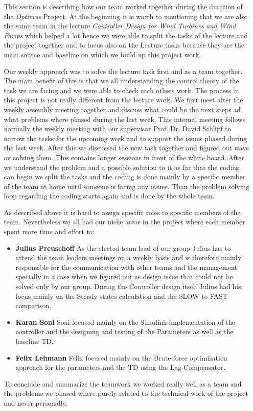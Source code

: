 This section is describing how our team worked together during the duration of the \textit{Optimus} Project. At the beginning it is worth to mentioning that we are also the same team in the lecture \textit{Controller Design for Wind	Turbines and Wind Farms} which helped a lot hence we were able to split the tasks of the lecture and the project together and to focus also on the Lecture tasks because they are the main source and baseline on which we build up this project work.

Our weekly approach was to solve the lecture task first and as a team together. The main benefit of this is that we all understanding the control theory of the task we are facing and we were able to check each others work. The process in this project is not really different from the lecture work. We first meet after the weekly assembly meeting together and discuss what could be the next steps ad what problems where phased during the last week. This internal meeting follows normally the weekly meeting with our supervisor Prof. Dr. David Schlipf to narrow the tasks for the upcoming week and to support the issues phased during the last week. After this we discussed the new task together and figured out ways ov solving them. This contains longer sessions in front of the white board. After we understand the problem and a possible solution to it as far that the coding can begin we split the tasks and the coding is done mainly by a specific member of the team at home until someone is facing any issues. Than the problem solving loop regarding the coding starts again and is done by the whole team. 

As described above it is hard to assign specific roles to specific members of the team. Nevertheless we all had our niche areas in the project where each member spent more time and effort to: 
\begin{itemize}
	\item \textbf{Julius Preuschoff} As the elected team lead of our group Julius has to attend the team leaders meetings on a weekly basis and is therefore mainly responsible for the communication with other teams and the management specially in a case when we figured out as design issue that could not be solved only by our group. During the Controller design itself Julius had his focus mainly on the Steady states calculation and the SLOW to FAST comparison.
	\item \textbf{Karan Soni} Soni focused mainly on the Simulink implementation of the controller and the designing and testing of the Parameters as well as the baseline TD.
	\item \textbf{Felix Lehmann} Felix focused mainly on the Brute-force optimization approach for the parameters and the TD using the Lag-Compensator.   
\end{itemize} 
 
 To conclude and summarize the teamwork we worked really well as a team and the problems we phased where purely related to the technical work of the project and never personally. 
